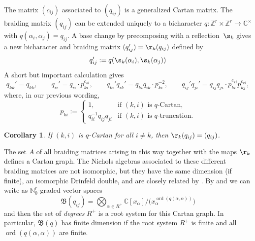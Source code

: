\documentclass[pdftex]{sigma}%
\numberwithin{equation}{section}
\newtheorem{cor}[teo]{Corollary}
\newcommand{\N}{\mathbb{N}}
\newcommand{\Z}{\mathbb{Z}}
\newcommand{\C}{\mathbb{C}}
\begin{document}
The matrix $(c_{ij})$ associated to $(q_{ij})$ is a generalized Cartan matrix. The braiding matrix $(q_{ij})$ can be extended uniquely to a bicharacter $q\colon \Z^r\times \Z^r\to \C^\times$ with $q(\alpha_i,\alpha_j)=q_{ij}$. A base change by precomposing with a reflection~$\s_k$ gives a new bicharacter and braiding matrix $(q_{ij}')=\r_k(q_{ij})$ defined by
\[q_{ij}':=q(\s_k(\alpha_i),\s_k(\alpha_j))\]
A short but important calculation \cite[equation~(3)]{Heck05} gives
\[
q_{kk}'=q_{kk},\qquad
q_{ii}'=q_{ii}\cdot p_{ki}^{c_{ki}},\qquad
q_{ki}'q_{ik}'=q_{ki}q_{ik}\cdot p_{ki}^{-2},\qquad
q_{ij}'q_{ji}'=q_{ij}q_{ji}\cdot p_{ki}^{c_{kj}}p_{kj}^{c_{ki}},
\]
where, in our previous wording,
\[p_{ki}:=\begin{cases}
1,&\text{if $(k,i)$ is $q$-Cartan},\\
q_{ii}^{-1}q_{ij}q_{ji}&\text{if $(k,i)$ is $q$-truncation}.
\end{cases}
\]
\begin{cor}
If $(k,i)$ is $q$-Cartan for all $i\neq k$, then $\r_k(q_{ij})=(q_{ij})$.
\end{cor}
The set $A$ of all braiding matrices arising in this way together with the maps $\r_k$ defines a Cartan graph. The Nichols algebras associated to these different braiding matrices are not isomorphic, but they have the same dimension (if finite), an isomorphic Drinfeld double, and are closely related by \cite{BLS15, Heck07,HS11}. By \cite[Remark~2.8]{AHS10} and \cite[Theorem~3.13]{Heck07} we can write as $\N_0^r$-graded vector spaces
\[\mathfrak{B}(q_{ij})= \bigotimes_ {\alpha\in R^+} \C[x_\alpha]/\big(x_\alpha^{\operatorname{ord}(q(\alpha,\alpha))}\big)\]
and then the set of \emph{degrees} $R^+$ is a root system for this Cartan graph. In particular, $\mathfrak{B}(q)$ has finite dimension if the root system $R^+$ is finite and all $\operatorname{ord}(q(\alpha,\alpha))$ are finite.
\end{document}
